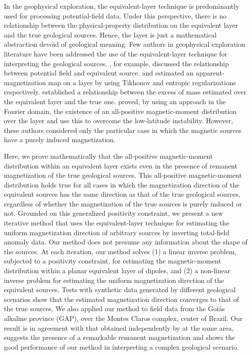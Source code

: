 In the geophysical exploration, the equivalent-layer technique is predominantly used for processing potential-field data. 
Under this perspective, there is no relationship between the physical-property distribution on the equivalent layer 
and the true geological sources. Hence, the layer is just a mathematical abstraction devoid of geological meaning. 
Few authors in geophysical exploration literature have been addressed the use of the equivalent-layer technique for interpreting
the geological sources. \cite{pedersen1991}, for example, discussed the relationship between potential field and equivalent source. 
\cite{medeiros_silva1996} and \cite{silva-etal2010} estimated an apparent-magnetization map on a layer by using Tikhonov and 
entropic regularizations respectively. \cite{siqueira_etal_2017} established a relationship between the excess of mass estimated 
over the equivalent layer and the true one. \cite{li_etal_2014} proved, by using an approach in the Fourier domain, 
the existence of an all-positive magnetic-moment distribution over the layer and use this to overcome the low-latitude instability. 
However, these authors considered only the particular case in which the magnetic sources have a purely induced magnetization.

Here, we prove mathematically that the all-positive magnetic-moment distribution within an equivalent layer exists even in the 
presence of remanent magnetization of the true geological sources. This all-positive magnetic-moment distribution holds true for 
all cases in which the magnetization direction of the equivalent sources has the same direction as that of the true geological sources, 
regardless of whether the magnetization of the true sources is purely induced or not. Grounded on this generalized positivity constraint, 
we present a new iterative method that uses the equivalent-layer technique for estimating the uniform magnetization direction of 
arbitrary sources by inverting total-field anomaly data. Our method does not presume any information about the shape of the sources. 
At each iteration, our method solves (1) a linear inverse problem, subjected to a positivity constraint, for estimating the magnetic-moment 
distribution within a planar equivalent layer of dipoles, and (2) a non-linear inverse problem for estimating the uniform magnetization 
direction of the equivalent sources. Tests with synthetic data generated by different geological scenarios show that the estimated magnetization
direction converges to that of the true sources. We also applied our method to field data from the Goi{\' a}s alkaline province (GAP), 
over the Montes Claros complex, center of Brazil. Our result is in agreement with that obtained independently by \cite{zhang_etal_2018} 
at the same area, suggests the presence of a remarkable remanent magnetization and shows the good performance of our method in interpreting 
a complex geological scenario.

